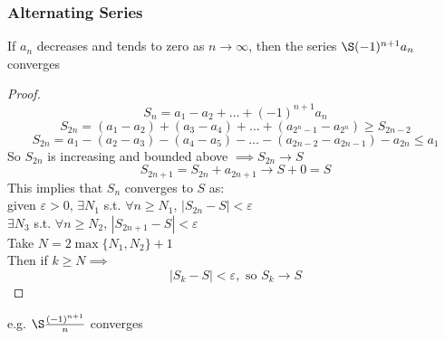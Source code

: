 \subsubsection{Alternating Series}
\begin{theorem}
If $a_n$ decreases and tends to zero as $n \to \infty$, then the series $\S (-1)^{n+1} a_n$ converges\\

\begin{proof}
\[S_n = a_1 -a_2 + \dots + (-1)^{n+1} a_n\]
\[S_{2n} = (a_1 - a_2) + (a_3 - a_4 ) + \dots + (a_{2^n - 1} - a_{2^n}) \geq S_{2n-2}\]
\[S_{2n} = a_1 - (a_2 - a_3) - (a_4 - a_5) - \dots - (a_{2n-2} - a_{2n-1}) - a_{2n} \leq a_1\]
So $S_{2n}$ is increasing and bounded above $\implies S_{2n} \to S$
\[S_{2n+1} = S_{2n} + a_{2n+1} \to S + 0 = S\]
This implies that $S_n$ converges to $S$ as:\\
given $\varepsilon > 0,\, \exists N_1$ s.t. $\forall n \geq N_1,\, |S_{2n} - S| < \varepsilon$\\
$\exists N_3$ s.t. $\forall n \geq N_2,\, |S_{2n+1} - S| < \varepsilon$\\
Take $N = 2 \max\{N_1,N_2\}+1$\\
Then if $k \geq N \implies$
\[|S_k - S| < \varepsilon,\text{ so } S_k \to S\]
\end{proof}
\begin{note}
e.g. $\S \frac{(-1)^{n+1}}{n}$ converges
\end{note}
\end{theorem}
